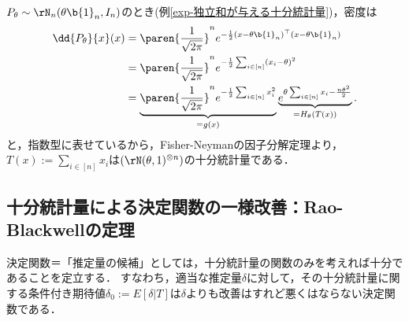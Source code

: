 \documentclass[uplatex,dvipdfmx]{jsreport}
\begin{document}
\begin{example}
    $P_\theta\sim\rN_n(\theta\b{1}_n,I_n)$のとき(例\ref{exp-独立和が与える十分統計量})，密度は
    \begin{align*}
        \dd{P_\theta}{x}(x)&=\paren{\frac{1}{\sqrt{2\pi}}}^ne^{-\frac{1}{2}(x-\theta\b{1}_n)^\top(x-\theta\b{1}_n)}\\
        &=\paren{\frac{1}{\sqrt{2\pi}}}^ne^{-\frac{1}{2}\sum_{i\in[n]}(x_i-\theta)^2}\\
        &=\underbrace{\paren{\frac{1}{\sqrt{2\pi}}}^ne^{-\frac{1}{2}\sum_{i\in[n]}x_i^2}}_{=g(x)}\underbrace{e^{\theta\sum_{i\in[n]}x_i-\frac{n\theta^2}{2}}}_{=H_\theta(T(x))}.
    \end{align*}
    と，指数型に表せているから，Fisher-Neymanの因子分解定理より，$T(x):=\sum_{i\in[n]}x_i$は$(\rN(\theta,1)^{\otimes n})$の十分統計量である．
\end{example}

\subsection{十分統計量による決定関数の一様改善：Rao-Blackwellの定理}

\begin{tcolorbox}[colframe=ForestGreen, colback=ForestGreen!10!white,breakable,colbacktitle=ForestGreen!40!white,coltitle=black,fonttitle=\bfseries\sffamily,
title=]
    決定関数＝「推定量の候補」としては，十分統計量の関数のみを考えれば十分であることを定立する．
    すなわち，適当な推定量$\delta$に対して，その十分統計量に関する条件付き期待値$\delta_0:=E[\delta|T]$は$\delta$よりも改善はすれど悪くはならない決定関数である．
\end{tcolorbox}
\end{document}
